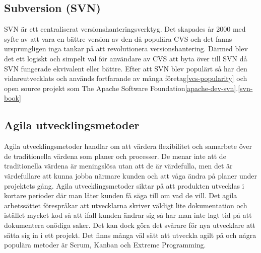 \subsection{Subversion (SVN)}
SVN är ett centraliserat versionshanteringsverktyg. Det skapades år 2000 med syfte av att vara en bättre version av den då populära CVS och det fanns ursprungligen inga tankar på att revolutionera versionshantering. Därmed blev det ett logiskt och simpelt val för användare av CVS att byta över till SVN då SVN fungerade ekvivalent eller bättre. Efter att SVN blev populärt så har den vidareutvecklats och används fortfarande av många företag\ref{vcs-popularity} och open source projekt som The Apache Software Foundation\ref{apache-dev-svn}.\ref{svn-book}

\subsection{Agila utvecklingsmetoder}
Agila utvecklingsmetoder handlar om att värdera flexibilitet och samarbete över de traditionella värdena som planer och processer. De menar inte att de traditionella värdena är meningslösa utan att de är värdefulla, men det är värdefullare att kunna jobba närmare kunden och att våga ändra på planer under projektets gång. Agila utvecklingsmetoder siktar på att produkten utvecklas i kortare perioder där man låter kunden få säga till om vad de vill. Det agila arbetssättet förespråkar att utvecklarna skriver väldigt lite dokumentation och istället mycket kod så att ifall kunden ändrar sig så har man inte lagt tid på att dokumentera onödiga saker. Det kan dock göra det svårare för nya utvecklare att sätta sig in i ett projekt.
Det finns många väl sätt att utveckla agilt på och några populära metoder är Scrum, Kanban och Extreme Programming.